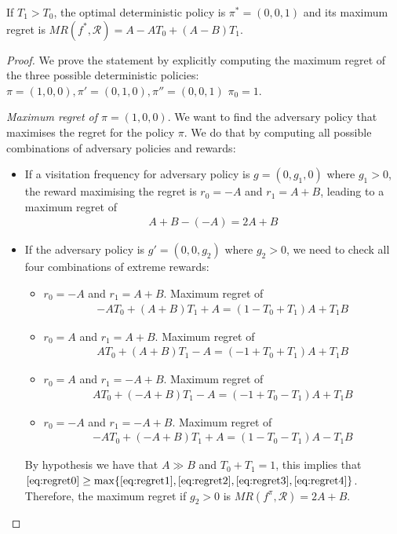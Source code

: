 \begin{proposition}\label{theorem:opt_det}
If $T_1 > T_0$, the optimal deterministic policy is $\pi^* = (0, 0, 1)$ and its maximum regret is $MR(f^*, \mathcal{R}) = A- A T_0 +(A-B) T_1$. 
\end{proposition}
\begin{proof}
We prove the statement by explicitly computing the maximum regret of the three possible deterministic policies:$\pi = (1, 0, 0), \pi' =(0, 1, 0), \pi''= (0, 0, 1)$ $\pi_0=1$.

\textit{Maximum regret of $\pi = (1, 0, 0)$}. We want to find the adversary policy that maximises the regret for the policy $\pi$. We do that by computing all possible combinations of adversary policies and rewards:
\begin{itemize}
\item If a visitation frequency for adversary policy is $g = (0, g_1, 0)$ where $g_1> 0$, the reward maximising the regret is $r_0 = -A$ and $r_1 = A+B$, leading to a maximum regret of 
\vspace{-0.5cm}
\begin{align}
A+B-(-A)=2A+B \label{eq:regret0}
\end{align}
\item If the adversary policy is $g' = (0, 0, g_2)$ where $g_2>0$, we need to check all four combinations of extreme rewards:
\begin{itemize}
\item $r_0 = -A$ and $r_1= A+B$. Maximum regret of
\vspace{-0.2cm}
\begin{align}
-A T_0 + (A+B)T_1 + A = (1-T_0 + T_1)A + T_1 B \label{eq:regret1}
\end{align}
\item $r_0 = A$ and $r_1= A+B$. Maximum regret of
\vspace{-0.2cm}
\begin{align}
A T_0 + (A+B)T_1 - A = (-1+T_0 + T_1)A + T_1 B  \label{eq:regret2}
\end{align}
\item $r_0 = A$ and $r_1= -A+B$. Maximum regret of
\vspace{-0.2cm}
\begin{align} 
A T_0 + (-A+B)T_1 - A =  (-1+T_0 - T_1)A + T_1 B \label{eq:regret3}
\end{align}
\item $r_0 = -A$ and $r_1= -A+B$. Maximum regret of
\vspace{-0.2cm}
\begin{align}
-A T_0 + (-A+B)T_1 + A =  (1 - T_0 - T_1)A - T_1 B \label{eq:regret4}
\end{align}
\end{itemize} 
By hypothesis we have that $A\gg B$ and $T_0+T_1= 1$, this implies that $\eqref{eq:regret0} \geq \max\{\eqref{eq:regret1}, \eqref{eq:regret2}, \eqref{eq:regret3}, \eqref{eq:regret4} \}$. Therefore, the maximum regret if $g_2>0$ is $MR(f^{\pi}, \mathcal{R}) = 2A+B$.
\end{itemize} 


\end{proof}
